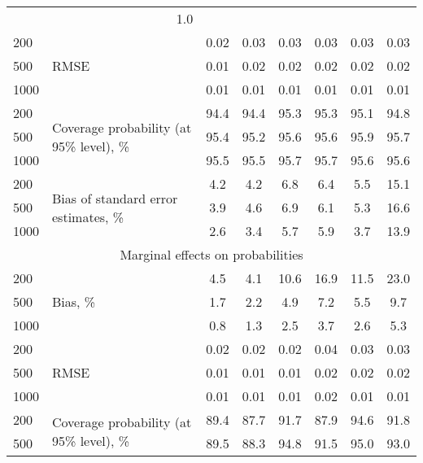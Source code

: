 \documentclass[letterpaper,fleqn,11pt]{article}
\begin{document}
\begin{onehalfspace}
\begin{table}[htbp]
\begin{tabular}{rrcccccc}
& 1.0 \\ 
\multicolumn{1}{l}{200} & \multicolumn{1}{l}{\multirow{3}[2]{*}{RMSE}} & 0.02
& 0.03 & 0.03 & 0.03 & 0.03 & 0.03 \\ 
\multicolumn{1}{l}{500} & \multicolumn{1}{l}{} & 0.01 & 0.02 & 0.02 & 0.02 & 
0.02 & 0.02 \\ 
\multicolumn{1}{l}{1000} & \multicolumn{1}{l}{} & 0.01 & 0.01 & 0.01 & 0.01
& 0.01 & 0.01 \\ 
\multicolumn{1}{l}{200} & \multicolumn{1}{l}{\multirow{3}[2]{4cm}{Coverage
probability (at 95\% level), \%}} & 94.4 & 94.4 & 95.3 & 95.3 & 95.1 & 94.8
\\ 
\multicolumn{1}{l}{500} & \multicolumn{1}{l}{} & 95.4 & 95.2 & 95.6 & 95.6 & 
95.9 & 95.7 \\ 
\multicolumn{1}{l}{1000} & \multicolumn{1}{l}{} & 95.5 & 95.5 & 95.7 & 95.7
& 95.6 & 95.6 \\ 
\multicolumn{1}{l}{200} & \multicolumn{1}{l}{\multirow{3}[2]{4cm}{Bias of
standard error estimates, \%}} & 4.2 & 4.2 & 6.8 & 6.4 & 5.5 & 15.1 \\ 
\multicolumn{1}{l}{500} & \multicolumn{1}{l}{} & 3.9 & 4.6 & 6.9 & 6.1 & 5.3
& 16.6 \\ 
\multicolumn{1}{l}{1000} & \multicolumn{1}{l}{} & 2.6 & 3.4 & 5.7 & 5.9 & 3.7
& 13.9 \\ 
\multicolumn{8}{c}{Marginal effects on probabilities} \\ 
\multicolumn{1}{l}{200} & \multicolumn{1}{l}{\multirow{3}[1]{*}{Bias, \%}} & 
4.5 & 4.1 & 10.6 & 16.9 & 11.5 & 23.0 \\ 
\multicolumn{1}{l}{500} & \multicolumn{1}{l}{} & 1.7 & 2.2 & 4.9 & 7.2 & 5.5
& 9.7 \\ 
\multicolumn{1}{l}{1000} & \multicolumn{1}{l}{} & 0.8 & 1.3 & 2.5 & 3.7 & 2.6
& 5.3 \\ 
\multicolumn{1}{l}{200} & \multicolumn{1}{l}{\multirow{3}[2]{*}{RMSE}} & 0.02
& 0.02 & 0.02 & 0.04 & 0.03 & 0.03 \\ 
\multicolumn{1}{l}{500} & \multicolumn{1}{l}{} & 0.01 & 0.01 & 0.01 & 0.02 & 
0.02 & 0.02 \\ 
\multicolumn{1}{l}{1000} & \multicolumn{1}{l}{} & 0.01 & 0.01 & 0.01 & 0.02
& 0.01 & 0.01 \\ 
\multicolumn{1}{l}{200} & \multicolumn{1}{l}{\multirow{3}[2]{4cm}{Coverage
probability (at 95\% level), \%}} & 89.4 & 87.7 & 91.7 & 87.9 & 94.6 & 91.8
\\ 
\multicolumn{1}{l}{500} & \multicolumn{1}{l}{} & 89.5 & 88.3 & 94.8 & 91.5 & 
95.0 & 93.0 \\ 

\end{tabular}
\end{table}
\end{onehalfspace}
\end{document}
